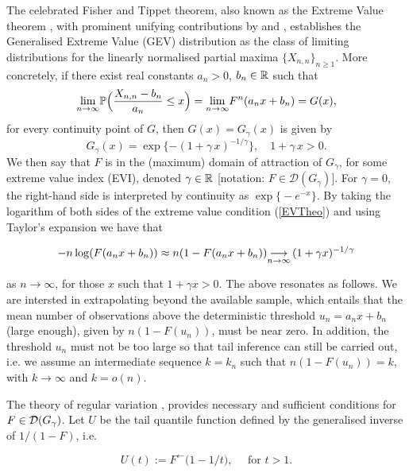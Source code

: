 The celebrated Fisher and Tippet theorem, also known as the Extreme Value theorem \citep{ft28}, with prominent unifying contributions by \cite{Gnedenko:43} and \cite{deHaan:70}, establishes the Generalised Extreme Value (GEV) distribution as the class of limiting distributions for the linearly normalised partial maxima $\{X_{n,n} \}_{n\geq 1}$. More concretely, if there exist real constants $a_n>0$, $b_n \in {\mathbb{R}}$ such that
\begin{equation}\label{EVTheo}
	\displaystyle {\lim_{n \rightarrow{\infty}}} \mathbb{P} \Bigl( \frac{X_{n,n}-b_n}{a_n} \leq x\Bigr)= \displaystyle {\lim_{n \rightarrow{\infty}}} F^n (a_n x + b_n) = G(x),
\end{equation}
for every continuity point of $G$, then $G(x)= G_{\gamma}(x)$ is given by
\begin{equation}\label{GEVd}
	G_{\gamma}(x)= \exp \{ -(1+ \gamma\, x)^{-1/\gamma}\}, \quad 1+\gamma\,x >0.
\end{equation}
We then say that $F$ is in the (maximum) domain of attraction of $G_\gamma$,  for some extreme value index (EVI), denoted $\gamma \in {\mathbb{R}}$ [notation: $F \in \mathcal{D}(G_{\gamma}) $]. For $\gamma=0$, the right-hand side is interpreted by continuity as $\exp\bigl\{-e^{-x}\bigr\}$. By taking the logarithm of both sides of the extreme value condition (\ref{EVTheo}) and using Taylor's expansion we have that 


\begin{equation}
-n\log(F(a_n x + b_n )) \approx n(1 - F(a_n x + b_n )) \displaystyle {\mathop {\longrightarrow}_{n \rightarrow \infty}\,} (1 + \gamma x )^{-1/\gamma}
\end{equation}

\noindent as $ n \rightarrow \infty$, for those $x$ such that $ 1 + \gamma x > 0 $. The above resonates as follows. We are intersted in extrapolating beyond the available sample, which entails that the mean number of observations above the deterministic threshold $ u_n = a_n x + b_n$ (large enough), given by $ n( 1- F(u_n)) $, must be near zero. In addition, the threshold $ u_n $ must not be too large so that tail inference can still be carried out, i.e. we assume an intermediate sequence $ k = k_n $ such that $ n (1 - F(u_n)) = k$, with $k \rightarrow \infty $ and $ k = o(n) $.

The theory of regular variation \citep{Binghametal:87,deHaan:70, deHF:06}, provides necessary and sufficient conditions for $F\in {\ensuremath{\mathcal{D}}}(G_{\gamma})$. Let $U$ be the tail quantile function defined by the generalised inverse of $1/(1-F)$, i.e.


\begin{equation*}
U(t):=   F^{\leftarrow} \bigl( 1-1/t\bigr), \quad \mbox{ for } t >  1.
\end{equation*}


